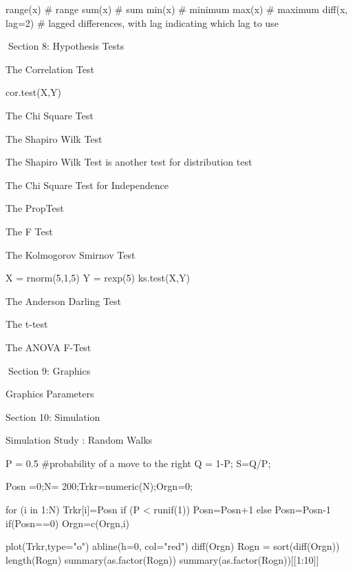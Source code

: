 \begin{frame}
\begin{frame}
range(x) 	    # range
sum(x) 		  # sum
min(x)	        # minimum
max(x)	       # maximum
diff(x, lag=2)   # lagged differences, with lag indicating which lag to use



 


 
Section 8: Hypothesis Tests

The Correlation Test

cor.test(X,Y)


The Chi Square Test





The Shapiro Wilk Test

The Shapiro Wilk Test is another test for distribution test





The Chi Square Test for Independence





The PropTest





The F Test





The Kolmogorov Smirnov Test

X = rnorm(5,1,5)
Y = rexp(5)
ks.test(X,Y)


The Anderson Darling Test






The t-test







The ANOVA F-Test

 
Section 9: Graphics


Graphics Parameters


Section 10: Simulation

Simulation Study : Random Walks



P = 0.5 					#probability of a move to the right
Q = 1-P; S=Q/P;

Posn =0;N= 200;Trkr=numeric(N);Orgn=0; 

for (i in 1:N)
	{
	Trkr[i]=Posn
	if (P < runif(1)) Posn=Posn+1 else Posn=Posn-1
	if(Posn==0) Orgn=c(Orgn,i)
	}


plot(Trkr,type="o")
abline(h=0, col="red")
diff(Orgn)
Rogn = sort(diff(Orgn))
length(Rogn)
summary(as.factor(Rogn))
summary(as.factor(Rogn))[[1:10]]


\end{frame}
\end{frame}
